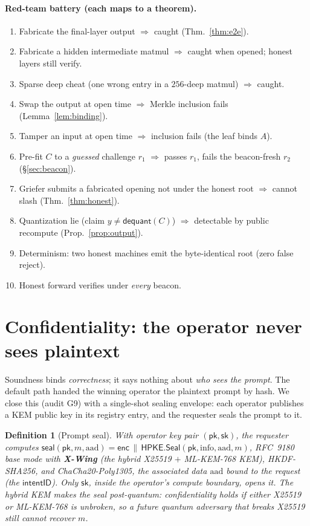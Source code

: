 \documentclass[11pt]{article}
\newtheorem{definition}{Definition}
\begin{document}
\paragraph{Red-team battery (each maps to a theorem).}
\begin{enumerate}[leftmargin=1.6em,itemsep=1pt]
\item Fabricate the final-layer output $\Rightarrow$ caught (Thm.~\ref{thm:e2e}).
\item Fabricate a hidden intermediate matmul $\Rightarrow$ caught when opened; honest layers still verify.
\item Sparse deep cheat (one wrong entry in a $256$-deep matmul) $\Rightarrow$ caught.
\item Swap the output at open time $\Rightarrow$ Merkle inclusion fails (Lemma~\ref{lem:binding}).
\item Tamper an input at open time $\Rightarrow$ inclusion fails (the leaf binds $A$).
\item Pre-fit $C$ to a \emph{guessed} challenge $r_1$ $\Rightarrow$ passes $r_1$, fails the beacon-fresh
$r_2$ (\S\ref{sec:beacon}).
\item Griefer submits a fabricated opening not under the honest root $\Rightarrow$ cannot slash
(Thm.~\ref{thm:honest}).
\item Quantization lie (claim $y\neq\mathsf{dequant}(C)$) $\Rightarrow$ detectable by public recompute
(Prop.~\ref{prop:output}).
\item Determinism: two honest machines emit the byte-identical root (zero false reject).
\item Honest forward verifies under \emph{every} beacon.
\end{enumerate}

\section{Confidentiality: the operator never sees plaintext}\label{sec:conf}

Soundness binds \emph{correctness}; it says nothing about \emph{who sees the prompt}. The default
path handed the winning operator the plaintext prompt by hash. We close this (audit G9) with a
single-shot sealing envelope: each operator publishes a KEM public key in its registry entry, and the
requester seals the prompt to it.

\begin{definition}[Prompt seal]
With operator key pair $(\mathsf{pk},\mathsf{sk})$, the requester computes
$\mathsf{seal}(\mathsf{pk},m,\mathrm{aad}) = \mathsf{enc}\,\|\,\mathsf{HPKE.Seal}(\mathsf{pk},\mathrm{info},\mathrm{aad},m)$,
RFC~9180 base mode with \textbf{X-Wing} (the hybrid X25519 $+$ ML-KEM-768 KEM), HKDF-SHA256, and
ChaCha20-Poly1305, the associated data $\mathrm{aad}$ bound to the request (the $\mathsf{intentID}$).
Only $\mathsf{sk}$, inside the operator's compute boundary, opens it. The hybrid KEM makes the seal
\emph{post-quantum}: confidentiality holds if \emph{either} X25519 or ML-KEM-768 is unbroken, so a
future quantum adversary that breaks X25519 still cannot recover $m$.
\end{definition}
\end{document}

